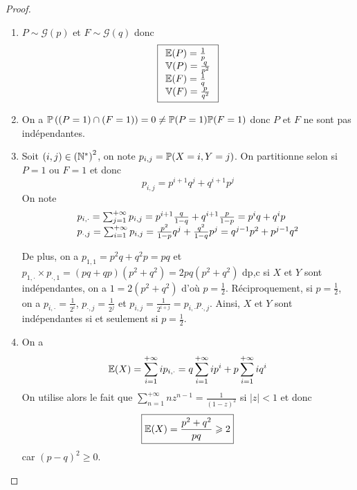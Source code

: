 \documentclass[12pt]{article}
\begin{document}
\begin{proof}
    \phantom{}
    \begin{enumerate}
        \item $P\sim\mathcal{G}(p)$ et $F\sim\mathcal{G}(q)$ donc 
        \begin{equation}
            \boxed{
                \begin{array}[]{l}
                    \E(P)=\frac{1}{p}\\
                    \mathbb{V}(P)=\frac{q}{p^{2}}\\
                    \E(F)=\frac{1}{q}\\
                    \mathbb{V}(F)=\frac{p}{q^{2}}
                \end{array}
            }
        \end{equation}

        \item On a $\P\left((P=1)\cap(F=1)\right)=0\neq\P(P=1)\P(F=1)$ donc $P$ et $F$ ne sont pas indépendantes.
        
        \item Soit $(i,j)\in\left(\N^{*}\right)^{2}$, on note $p_{i,j}=\P(X=i,Y=j)$. On partitionne selon si $P=1$ ou $F=1$ et donc 
        \begin{equation}
            \boxed{p_{i,j}=p^{i+1}q^{j}+q^{i+1}p^{j}}
        \end{equation}
        On note 
        \begin{equation}
            \begin{array}[]{l}
                p_{i,\cdot}=\sum_{j=1}^{+\infty}p_{i,j}=p^{i+1}\frac{q}{1-q}+q^{i+1}\frac{p}{1-p}=p^{i}q+q^{i}p\\
                p_{\cdot,j}=\sum_{i=1}^{+\infty}p_{i,j}=\frac{p^{2}}{1-p}q^{j}+\frac{q^{2}}{1-q}p^{j}=q^{j-1}p^{2}+p^{j-1}q^{2}
            \end{array}
        \end{equation}

        De plus, on a $p_{1,1}=p^{2}q+q^{2}p=pq$ et $p_{1,\cdot}\times p_{\cdot,1}=(pq+qp)(p^{2}+q^{2})=2pq(p^{2}+q^{2})$ dp,c si $X$ et $Y$ sont indépendantes, on a $1=2(p^{2}+q^{2})$ d'où $p=\frac{1}{2}$. Réciproquement, si $p=\frac{1}{2}$, on a $p_{i,\cdot}=\frac{1}{2^{i}}$, $p_{\cdot, j}=\frac{1}{2^{j}}$ et $p_{i,j}=\frac{1}{2^{i+j}}=p_{i,\cdot}p_{\cdot,j}$. Ainsi, $X$ et $Y$ sont indépendantes si et seulement si $p=\frac{1}{2}$.

        \item On a 
        \begin{equation}
            \E(X)=\sum_{i=1}^{+\infty}ip_{i,\cdot}=q\sum_{i=1}^{+\infty}ip^{i}+p\sum_{i=1}^{+\infty}iq^{i}
        \end{equation}
        On utilise alors le fait que $\sum_{n=1}^{+\infty}nz^{n-1}=\frac{1}{(1-z)^{2}}$ si $\left\lvert z\right\rvert<1$ et donc 
        \begin{equation}
            \boxed{\E(X)=\frac{p^{2}+q^{2}}{pq}\geqslant2}
        \end{equation}
        car $(p-q)^{2}\geqslant0$.


\end{enumerate}
\end{proof}
\end{document}

